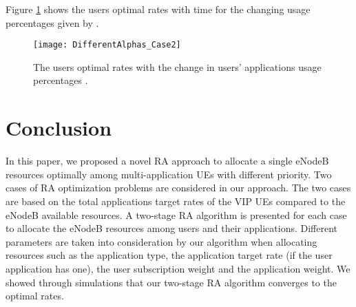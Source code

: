 \documentclass[journal]{IEEEtran} 				\IEEEoverridecommandlockouts 						\usepackage{amsmath,amssymb}
\begin{document}
Figure \ref{fig:DifferentAlphas_Case2} shows the users optimal rates  with time for the changing usage percentages given by .
\begin{figure}
\centering
\texttt{[image: DifferentAlphas\_Case2]}
\caption{The users optimal rates  with the change in users' applications usage percentages .}
\label{fig:DifferentAlphas_Case2}
\end{figure}
\section{Conclusion}\label{sec:conclude}
In this paper, we proposed a novel RA approach to allocate a single eNodeB resources optimally among multi-application UEs with different priority. Two cases of RA optimization problems are considered in our approach. The two cases are based on the total applications target rates of the VIP UEs compared to the eNodeB available resources. A two-stage RA algorithm is presented for each case to allocate the eNodeB resources among users and their applications. Different parameters are taken into consideration by our algorithm when allocating resources such as the application type, the application target rate (if the user application has one), the user subscription weight and the application weight. We showed through simulations that our two-stage RA algorithm converges to the optimal rates.

\end{document}

